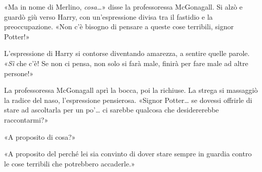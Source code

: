 «Ma in nome di Merlino, \textit{cosa…}» disse la professoressa McGonagall. Si alzò e guardò giù verso Harry, con un’espressione divisa tra il fastidio e la preoccupazione. «Non c’è bisogno di pensare a queste cose terribili, signor Potter!»

L’espressione di Harry si contorse diventando amarezza, a sentire quelle parole. «\textit{Sì} che c’è! Se non ci pensa, non solo si farà male, finirà per fare male ad altre persone!»

La professoressa McGonagall aprì la bocca, poi la richiuse. La strega si massaggiò la radice del naso, l’espressione pensierosa. «Signor Potter… se dovessi offrirle di stare ad ascoltarla per un po’… ci sarebbe qualcosa che desidererebbe raccontarmi?»

«A proposito di cosa?»

«A proposito del perché lei sia convinto di dover stare sempre in guardia contro le cose terribili che potrebbero accaderle.»

